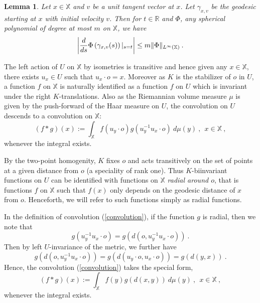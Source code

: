 \documentclass[12pt]{amsart}
\newtheorem{lemma}[theorem]{Lemma}
\theoremstyle{definition}
\newcommand{\R}{\mathbb R}%
\newcommand{\X}{\mathbb X}%
\numberwithin{equation}{section}
\begin{document}
\begin{lemma} \cite[Lemma 3.2]{Platonov} \label{primitive_bernstein}
Let $x \in \X$ and $v$ be a unit tangent vector at $x$. Let $\gamma_{x,v}$ be the geodesic starting at $x$ with initial velocity $v$. Then for $t \in \R$ and $\Phi$, any spherical polynomial of degree at most $m$ on $\X$, we have
\begin{equation*}
\left|\frac{d}{ds}\Phi\left(\gamma_{x,v}(s)\right)\large{|}_{s=t}\right| \le m \|\Phi\|_{L^\infty(\X)}\:.
\end{equation*}
\end{lemma}
The left action of $U$ on $\X$ by isometries is transitive and hence given any $x \in \X$, there exists $u_x \in U$ such that $u_x \cdot o=x$. Moreover as $K$ is the stabilizer of $o$ in $U$, a function $f$ on $\X$ is naturally identified as a function $f$ on $U$ which is invariant under the right $K$-translations. Also as the Riemannian volume measure $\mu$ is given by the push-forward of the Haar measure on $U$, the convolution on $U$ descends to a convolution on $\X$:
\begin{equation}\label{convolution}
\left(f*g\right)(x):= \int_{\X} f(u_y\cdot o)g(u^{-1}_y u_x \cdot o)\:d\mu(y)\:,\:\:x\in \X\:,
\end{equation}
whenever the integral exists.

By the two-point homogenity, $K$ fixes $o$ and acts transitively on the set of points at a given distance from $o$ (a speciality of rank one). Thus $K$-biinvariant functions on $U$ can be identified with functions on $\X$ {\em radial around $o$}, that is functions $f$ on $\X$ such that $f(x)$ only depends on the geodesic distance of $x$ from $o$. Henceforth, we will refer to such functions simply as radial functions.

In the definition of convolution (\ref{convolution}), if the function $g$ is radial, then we note that
\begin{equation*}
g(u^{-1}_y u_x \cdot o)=g\left(d\left(o,u^{-1}_y u_x \cdot o\right)\right)\:.
\end{equation*}
Then by left $U$-invariance of the metric, we further have
\begin{equation*}
g\left(d\left(o,u^{-1}_y u_x \cdot o\right)\right)=g\left(d\left(u_y\cdot o, u_x \cdot o\right)\right)=g(d(y,x))\:.
\end{equation*} 
Hence, the convolution (\ref{convolution}) takes the special form,
\begin{equation}\label{convolution_radial}
\left(f*g\right)(x):= \int_{\X} f(y)g(d(x,y))\:d\mu(y)\:,\:\:x\in \X\:,
\end{equation}
whenever the integral exists.
\end{document}
